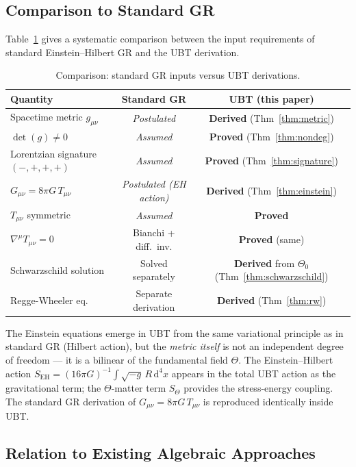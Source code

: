 \documentclass[12pt,a4paper]{article}
\theoremstyle{definition}
\theoremstyle{remark}
\begin{document}
\subsection{Comparison to Standard GR}

Table~\ref{tab:comparison} gives a systematic comparison between the input
requirements of standard Einstein--Hilbert GR and the UBT derivation.

\begin{table}[ht]
\centering
\caption{Comparison: standard GR inputs versus UBT derivations.}
\label{tab:comparison}
\begin{tabular}{lcc}
\toprule
\textbf{Quantity} & \textbf{Standard GR} & \textbf{UBT (this paper)} \\
\midrule
Spacetime metric $g_{\mu\nu}$ & \emph{Postulated} & \textbf{Derived} (Thm~\ref{thm:metric}) \\
$\det(g) \neq 0$ & \emph{Assumed} & \textbf{Proved} (Thm~\ref{thm:nondeg}) \\
Lorentzian signature $(-,+,+,+)$ & \emph{Assumed} & \textbf{Proved} (Thm~\ref{thm:signature}) \\
$G_{\mu\nu} = 8\pi G\,T_{\mu\nu}$ & \emph{Postulated (EH action)} & \textbf{Derived} (Thm~\ref{thm:einstein}) \\
$T_{\mu\nu}$ symmetric & \emph{Assumed} & \textbf{Proved} \\
$\nabla^\mu T_{\mu\nu} = 0$ & Bianchi + diff.\ inv. & \textbf{Proved} (same) \\
Schwarzschild solution & Solved separately & \textbf{Derived} from $\Theta_0$ (Thm~\ref{thm:schwarzschild}) \\
Regge-Wheeler eq. & Separate derivation & \textbf{Derived} (Thm~\ref{thm:rw}) \\
\bottomrule
\end{tabular}
\end{table}

The Einstein equations emerge in UBT from the same variational principle as
in standard GR (Hilbert action), but the \emph{metric itself} is not an
independent degree of freedom — it is a bilinear of the fundamental field
$\Theta$.
The Einstein--Hilbert action $S_{\mathrm{EH}} = (16\pi G)^{-1}\int\!\sqrt{-g}\,R\,\mathrm{d}^4x$
appears in the total UBT action as the gravitational term; the $\Theta$-matter
term $S_\Theta$ provides the stress-energy coupling.
The standard GR derivation of $G_{\mu\nu} = 8\pi G\,T_{\mu\nu}$ is
reproduced identically inside UBT.

\subsection{Relation to Existing Algebraic Approaches}
\end{document}
